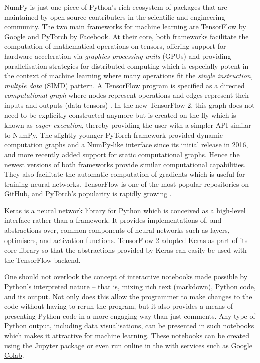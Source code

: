 NumPy is just one piece of Python's rich ecosystem of packages that are maintained by open-source contributers in the scientific and engineering community.
The two main frameworks for machine learning are \href{https://www.tensorflow.org/}{TensorFlow} by Google and \href{https://www.pytorch.org/}{PyTorch} by Facebook. 
At their core, both frameworks facilitate the computation of mathematical operations on tensors, offering support for hardware acceleration via \textit{graphics processing units} (GPUs) and providing parallelisation strategies for distributed computing which is especially potent in the context of machine learning where many operations fit the \textit{single instruction, multple data} (SIMD) pattern.
A TensorFlow program is specified as a directed \textit{computational graph} where nodes represent operations and edges represent their inputs and outputs (data tensors) \cite{tensorflow2015whitepaper}.
In the new TensorFlow 2, this graph does not need to be explicitly constructed anymore but is created on the fly which is known as \textit{eager execution}, thereby providing the user with a simpler API similar to NumPy.
The slightly younger PyTorch framework provided dynamic computation graphs and a NumPy-like interface since its initial release in 2016, and more recently added support for static computational graphs.
Hence the newest versions of both frameworks provide similar computational capabilities.
They also facilitate the automatic computation of gradients which is useful for training neural networks. 
TensorFlow is one of the most popular repositories on GitHub, and PyTorch's popularity is rapidly growing \cite{github2019}.

\href{https://keras.io/}{Keras} is a neural network library for Python which is conceived as a high-level interface rather than a framework. 
It provides implementations of, and abstractions over, common components of neural networks such as layers, optimisers, and activation functions.
TensorFlow 2 adopted Keras as part of its core library so that the abstractions provided by Keras can easily be used with the TensorFlow backend.

One should not overlook the concept of interactive notebooks made possible by Python's interpreted nature -- that is, mixing rich text (markdown), Python code, and its output. 
Not only does this allow the programmer to make changes to the code without having to rerun the program, but it also provides a means of presenting Python code in a more engaging way than just comments.
Any type of Python output, including data visualisations, can be presented in such notebooks which makes it attractive for machine learning.
These notebooks can be created using the \href{https://jupyter.org/}{Jupyter} package or even run online in the with services such as \href{https://colab.research.google.com/}{Google Colab}. 

